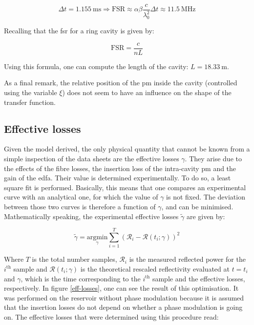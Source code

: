 \begin{equation}
	\Delta t = \SI{1.155}{\milli\second} \Longrightarrow \text{FSR} \approx  \alpha \beta \frac{c}{\lambda_0^2} \Delta t  \approx \SI{11.5}{\mega\hertz}
\end{equation}

Recalling that the \gls{fsr} for a ring cavity is given by:

\begin{equation}
	\mathrm{FSR} = \frac{c}{nL}
\end{equation}

Using this formula, one can compute the length of the cavity: $L=\SI{18.33}{\metre}$.

As a final remark, the relative position of the \gls{pm} inside the cavity (controlled using the variable $\xi$) does not seem to have an influence on the shape of the transfer function.


\subsection{Effective losses}

\label{subsec-effective-losses}

Given the model derived, the only physical quantity that cannot be known from a simple inspection of the data sheets are the effective losses $\gamma$. They arise due to the effects of the fibre losses, the insertion loss of the intra-cavity \gls{pm} and the gain of the \gls{edfa}. Their value is determined experimentally. To do so, a least square fit is performed. Basically, this means that one compares an experimental curve with an analytical one, for which the value of $\gamma$ is not fixed. The deviation between those two curves is therefore a function of $\gamma$, and can be minimised. Mathematically speaking, the experimental effective losses $\tilde{\gamma}$ are given by:

\begin{equation}
	\tilde{\gamma} = \underset{\gamma}{\mathrm{argmin}} \sum_{i=1}^T (\mathcal{R}_i - \mathcal{R}(t_i;\gamma))^2
\end{equation}

Where $T$ is the total number samples, $\mathcal{R}_i$ is the measured reflected power for the $i^{\text{th}}$ sample and $\mathcal{R}(t_i;\gamma)$ is the theoretical rescaled reflectivity evaluated at $t=t_i$ and $\gamma$, which is the time corresponding to the $i^{\text{th}}$ sample and the effective losses, respectively. In figure \ref{eff-losses}, one can see the result of this optimisation. It was performed on the reservoir without phase modulation because it is assumed that the insertion losses do not depend on whether a phase modulation is going on. The effective losses that were determined using this procedure read:

